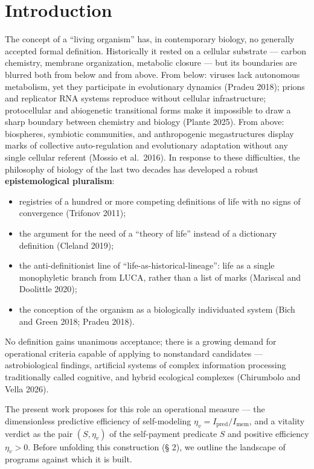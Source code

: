 \documentclass[pdflatex,sn-mathphys-ay]{sn-jnl}
\providecommand{\tightlist}{\setlength{\itemsep}{0pt}\setlength{\parskip}{0pt}}
\begin{document}
\section{Introduction}\label{introduction}

The concept of a ``living organism'' has, in contemporary biology, no generally accepted formal definition. Historically it rested on a cellular substrate --- carbon chemistry, membrane organization, metabolic closure --- but its boundaries are blurred both from below and from above. From below: viruses lack autonomous metabolism, yet they participate in evolutionary dynamics (Pradeu 2018); prions and replicator RNA systems reproduce without cellular infrastructure; protocellular and abiogenetic transitional forms make it impossible to draw a sharp boundary between chemistry and biology (Plante 2025). From above: biospheres, symbiotic communities, and anthropogenic megastructures display marks of collective auto-regulation and evolutionary adaptation without any single cellular referent (Mossio et al.~2016). In response to these difficulties, the philosophy of biology of the last two decades has developed a robust \textbf{epistemological pluralism}:

\begin{itemize}
\tightlist
\item
  registries of a hundred or more competing definitions of life with no signs of convergence (Trifonov 2011);
\item
  the argument for the need of a ``theory of life'' instead of a dictionary definition (Cleland 2019);
\item
  the anti-definitionist line of ``life-as-historical-lineage'': life as a single monophyletic branch from LUCA, rather than a list of marks (Mariscal and Doolittle 2020);
\item
  the conception of the organism as a biologically individuated system (Bich and Green 2018; Pradeu 2018).
\end{itemize}

No definition gains unanimous acceptance; there is a growing demand for operational criteria capable of applying to nonstandard candidates --- astrobiological findings, artificial systems of complex information processing traditionally called cognitive, and hybrid ecological complexes (Chirumbolo and Vella 2026).

The present work proposes for this role an operational measure --- the dimensionless predictive efficiency of self-modeling \(\eta_v = I_{\text{pred}}/I_{\text{mem}}\), and a vitality verdict as the pair \((S, \eta_v)\) of the self-payment predicate \(S\) and positive efficiency \(\eta_v > 0\). Before unfolding this construction (§ 2), we outline the landscape of programs against which it is built.
\end{document}
